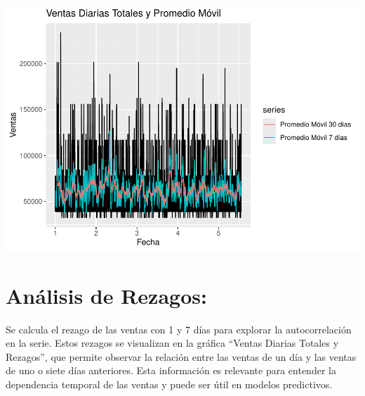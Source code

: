 \documentclass[
]{book}
\begin{document}
\includegraphics{_main_files/figure-latex/unnamed-chunk-7-1.pdf}

\section{Análisis de Rezagos:}\label{anuxe1lisis-de-rezagos}

Se calcula el rezago de las ventas con 1 y 7 días para explorar la autocorrelación en la serie. Estos rezagos se visualizan en la gráfica ``Ventas Diarias Totales y Rezagos'', que permite observar la relación entre las ventas de un día y las ventas de uno o siete días anteriores. Esta información es relevante para entender la dependencia temporal de las ventas y puede ser útil en modelos predictivos.
\end{document}
